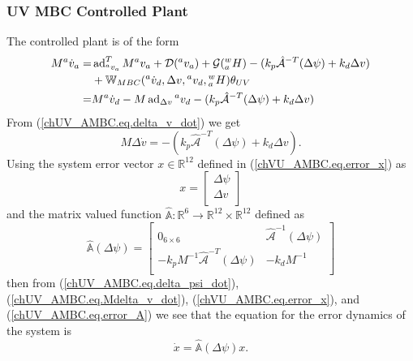 \subsubsection{\acs{UV} \acs{MBC} Controlled Plant}
\label{chUV_AMBC.sec.UV_MBC_controlledPlant}

The controlled plant is of the form
%
\begin{align}
  M{^a}\dot{v}_a=
     &\operatorname{ad}_{{^a}v_a}^T M{^a}v_a+\mathcal{D}({^a}v_a)+\mathcal{G}({^w_a}H)
      -(k_p\hat{\mathcal{A}}^{-T}(\Delta \psi)+k_d\Delta v)
\nonumber \\ 
     &+\mathbb{W}_{MBC}({^a}\dot{v}_d,\Delta v, {^a}v_d , {^w_a}H)\theta_{UV}
\nonumber \\
     =&M{^a}\dot{v}_d - M\operatorname{ad}_{\Delta v}{^a}v_d
      -(k_p\hat{\mathcal{A}}^{-T}(\Delta \psi)+k_d\Delta v)
\end{align}
%
From (\ref{chUV_AMBC.eq.delta_v_dot}) we get
%
\begin{equation}\label{chUV_AMBC.eq.Mdelta_v_dot}
M \Delta\dot{ v} =       -(k_p\hat{\mathcal{A}}^{-T}(\Delta \psi)+k_d\Delta v).
\end{equation}
%
Using the system error vector $x\in\mathbb{R}^{12}$ defined in
(\ref{chVU_AMBC.eq.error_x}) as
%
\begin{equation}
x=\left[ \begin{array}{c}
     \Delta \psi           \\
     \Delta v              \\
\end{array} \right]
\end{equation}
%
and the matrix valued function
$\hat{\mathbb{A}}:\mathbb{R}^6\to\mathbb{R}^{12}\times\mathbb{R}^{12}$ defined as
%
\begin{equation}\label{chUV_AMBC.eq.error_A}
\hat{\mathbb{A}}(\Delta \psi)=
\left[ \begin{array}{cc}
     0_{6\times 6}   & \hat{\mathcal{A}}^{-1}(\Delta \psi)             \\
     -k_p M^{-1}\hat{\mathcal{A}}^{-T}(\Delta \psi)   &  -k_d M^{-1}   \\
\end{array} \right]
\end{equation}
%
then from (\ref{chUV_AMBC.eq.delta_psi_dot}),
(\ref{chUV_AMBC.eq.Mdelta_v_dot}), (\ref{chVU_AMBC.eq.error_x}), and
(\ref{chUV_AMBC.eq.error_A}) we see that the equation for the error
dynamics of the system  is
%
\begin{equation} \label{chUV_AMBC.eq.err_sys}
\dot{x}=\hat{\mathbb{A}}(\Delta \psi) x.
\end{equation}

